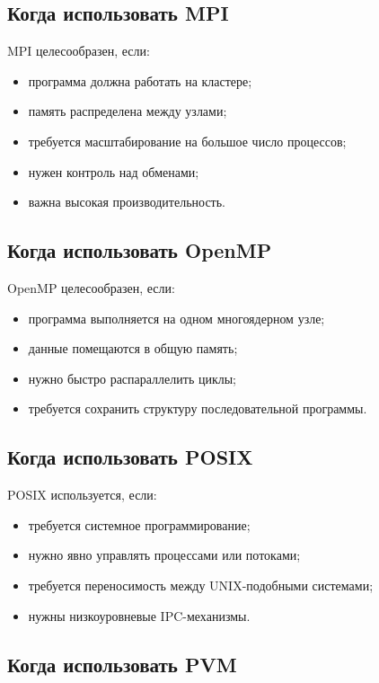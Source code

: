 \documentclass[12pt,a4paper]{article}
\begin{document}
\subsection{Когда использовать MPI}

MPI целесообразен, если:
\begin{itemize}
    \item программа должна работать на кластере;
    \item память распределена между узлами;
    \item требуется масштабирование на большое число процессов;
    \item нужен контроль над обменами;
    \item важна высокая производительность.
\end{itemize}

\subsection{Когда использовать OpenMP}

OpenMP целесообразен, если:
\begin{itemize}
    \item программа выполняется на одном многоядерном узле;
    \item данные помещаются в общую память;
    \item нужно быстро распараллелить циклы;
    \item требуется сохранить структуру последовательной программы.
\end{itemize}

\subsection{Когда использовать POSIX}

POSIX используется, если:
\begin{itemize}
    \item требуется системное программирование;
    \item нужно явно управлять процессами или потоками;
    \item требуется переносимость между UNIX-подобными системами;
    \item нужны низкоуровневые IPC-механизмы.
\end{itemize}

\subsection{Когда использовать PVM}
\end{document}
